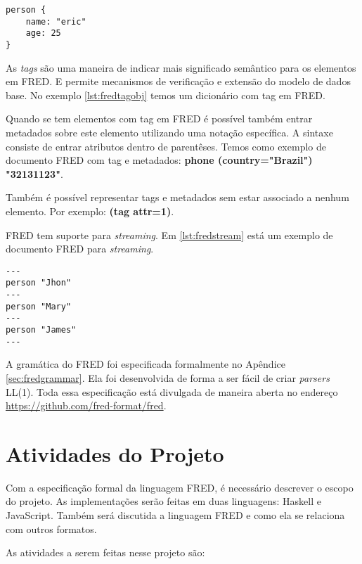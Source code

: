 \begin{lstlisting}[caption=Exemplo de dicionário com Tag em FRED,label={lst:fredtagobj}]
person {
    name: "eric"
    age: 25
}
\end{lstlisting}
    
As \textit{tags} são uma maneira de indicar mais significado semântico para os elementos em FRED. E permite
mecanismos de verificação e extensão do modelo de dados base. No exemplo \ref{lst:fredtagobj} 
temos um dicionário com tag em FRED.

Quando se tem elementos com tag em FRED é possível também entrar metadados sobre este elemento 
utilizando uma notação específica. A sintaxe consiste de entrar atributos dentro de parentêses. 
Temos como exemplo de documento FRED com tag e metadados: \textbf{phone (country="Brazil") "32131123"}.

Também é possível representar tags e metadados sem estar associado a nenhum elemento. 
Por exemplo: \textbf{(tag attr=1)}.

FRED tem suporte para \textit{streaming}. Em \ref{lst:fredstream} está
um exemplo de documento FRED para \textit{streaming}.

\begin{lstlisting}[caption=Exemplo de documento com streaming em FRED,label={lst:fredstream}]
---
person "Jhon"
---
person "Mary"
---
person "James"
---
\end{lstlisting}

A gramática do FRED foi especificada formalmente no Apêndice \ref{sec:fredgrammar}.
Ela foi desenvolvida de forma a ser fácil de criar \textit{parsers} LL(1). Toda essa especificação
está divulgada de maneira aberta no endereço \url{https://github.com/fred-format/fred}.
 
\section{Atividades do Projeto}

Com a especificação formal da linguagem FRED, é necessário 
descrever o escopo do projeto. As implementações serão feitas 
em duas linguagens: Haskell e JavaScript. Também será discutida
a linguagem FRED e como ela se relaciona com outros formatos.

As atividades a serem feitas nesse projeto são:

